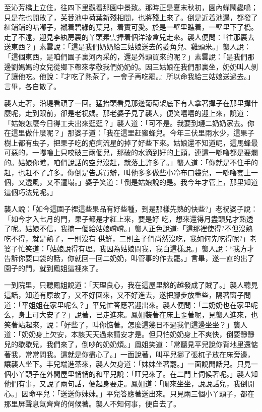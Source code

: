 至沁芳橋上立住，往四下里觀看那園中景致。那時正是夏末秋初，園內蟬鬧蟲鳴；只是花也開敗了，芙蓉池中荷葉新殘相間，也將殘上來了。倒是近着池邊，都發了紅鋪鋪的咕嘟子，襯着碧綠的葉兒，着實可愛。於是一壁里瞧着，一壁里下了橋。走了不遠，迎見李紈房裏的丫頭素雲捧着個洋漆盒兒走來。襲人便問：「往那裏去送東西？」素雲說：「這是我們奶奶給三姑娘送去的菱角兒、雞頭米。」襲人說：「這個東西，是咱們園子裏河內采的，還是外頭買來的呢？」素雲說：「是我們那邊劉媽媽的女兒從鄉下帶來孝敬我們奶奶的。因三姑娘在我們那裏坐，奶奶叫人剝了讓他吃。他說：『才吃了熱茶了，一會子再吃罷。』所以命我給三姑娘送過去。」言畢，各自散了。

襲人走著，沿堤看頑了一回。猛抬頭看見那邊葡萄架底下有人拿著撣子在那里撣什麼呢，走到跟前，卻是老祝媽。那老婆子見了襲人，便笑嘻嘻的迎上來，說道：「姑娘怎麼今日得工夫出來逛逛？」襲人道：「可不是。我要到璉二奶奶家去。你在這里做什麼呢？」那婆子道：「我在這里赶蜜蜂兒。今年三伏里雨水少，這果子樹上都有虫子，把果子吃的疤瘌流星的掉了好些下來。姑娘還不知道呢，這馬蜂最可惡的，一嘟嚕上只咬破三兩個兒，那破的水滴到好的上頭，連這一嘟嚕都是要爛的。姑娘你瞧，咱們說話的空兒沒赶，就落上許多了。」襲人道：「你就是不住手的赶，也赶不了許多。你倒是告訴買辦，叫他多多做些小冷布口袋兒，一嘟嚕套上一個，又透風，又不遭塌。」婆子笑道：「倒是姑娘說的是。我今年才管上，那里知道這個巧法兒呢。」

襲人說：「如今這園子裡這些果品有好些種，到是那樣先熟的快些?」老祝婆子說：「如今才入七月的門，果子都是才紅上來，要是好 吃，想來還得月盡頭兒才熟透了呢。姑娘不信，我摘一個給姑娘嚐嚐。」襲人正色說道:「這那裡使得?不但沒熟吃不得，就是熟了，一則沒有 供鮮，二則主子們尚然沒吃，我如何先吃得呢?」老婆子忙笑道：「姑娘說得有理。我因為姑娘問我，我白這樣說。」襲人說：“我方才告訴你要口袋的話，你就回一回二奶奶，叫管事的作去罷。」言畢，遂一直的出了園子的門，就到鳳姐這裡來了。

 一到院里，只聽鳳姐說道：「天理良心，我在這屋里熬的越發成了賊了。」襲人聽見這話，知道有原故了，又不好回來，又不好進去，遂把腳步放重些，隔著窗子問道：「平姐姐在家里呢么？」平兒忙答應著迎出來。襲人便問：「二奶奶也在家里呢么，身上可大安了？」說著，已走進來。鳳姐裝著在床上歪著呢，見襲人進來，也笑著站起來，說：「好些了，叫你惦著。怎麼這幾日不過我們這邊坐坐？」襲人道：「奶奶身上欠安，本該天天過來請安才是。但只怕奶奶身上不爽快，倒要靜靜兒的歇歇兒，我們來了，倒吵的奶奶煩。」鳳姐笑道：「常聽見平兒說你背地里還惦著我，常常問我。這就是你盡心了。」一面說著，叫平兒挪了張杌子放在床旁邊，讓襲人坐下。丰兒端進茶來，襲人欠身道：「妹妹坐著罷。」一面說閒話兒。只見一個小丫頭子在外間屋里悄悄的和平兒說：「旺兒來了。在二門上伺候著呢。」襲人知他們有事，又說了兩句話，便起身要走。鳳姐道：「閒來坐坐，說說話兒，我倒開心。」因命平兒：「送送你妹妹。」平兒答應著送出來。只見兩三個小丫頭子，都在那里屏聲息氣齊齊的伺候著。襲人不知何事，便自去了。


